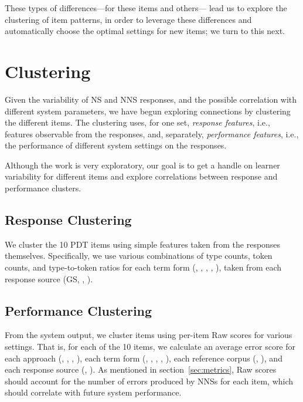 These types of differences---for these items and others---
lead us to explore the clustering of item patterns, in order to
leverage these differences and automatically choose the optimal
settings for new items; we turn to this next.

\section{Clustering}
\label{sec:clustering}

Given the variability of NS and NNS responses, and the possible
correlation with different system parameters, we have begun exploring
connections by clustering the different items.  The clustering uses,
for one set, \emph{response features}, i.e., features observable from
the responses, and, separately, \emph{performance features}, i.e., the
performance of different system settings on the responses.

Although the work is very exploratory, our goal is to get a handle on
learner variability for different items and explore correlations
between response and performance clusters.

\subsection{Response Clustering}

We cluster the 10 PDT items using simple features taken from the
responses themselves. Specifically, we use various combinations of
type counts, token counts, and type-to-token ratios for each term form
(, , , , ),
taken from each response source (GS, , ).

\subsection{Performance Clustering}

From the system output, we cluster items using per-item Raw 
scores for various settings. That is, for each of the 10 items, we
calculate an average error score for each approach
(, , , ), each term form
(, , , , ),
each reference corpus (, ), and each
response source (, ). 
As mentioned in section~\ref{sec:metrics}, Raw scores should account for the number of
errors produced by NNSs for each item, which should 
correlate with future system performance.

